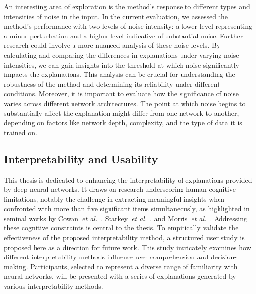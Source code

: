 An interesting area of exploration is the method's response to different types and intensities of noise in the input. In the current evaluation, we assessed the method's performance with two levels of noise intensity: a lower level representing a minor perturbation and a higher level indicative of substantial noise. Further research could involve a more nuanced analysis of these noise levels. By calculating and comparing the differences in explanations under varying noise intensities, we can gain insights into the threshold at which noise significantly impacts the explanations. This analysis can be crucial for understanding the robustness of the method and determining its reliability under different conditions. Moreover, it is important to evaluate how the significance of noise varies across different network architectures. The point at which noise begins to substantially affect the explanation might differ from one network to another, depending on factors like network depth, complexity, and the type of data it is trained on. 

\subsection{Interpretability and Usability}
\label{study}
This thesis is dedicated to enhancing the interpretability of explanations provided by deep neural networks. It draws on research underscoring human cognitive limitations, notably the challenge in extracting meaningful insights when confronted with more than five significant items simultaneously, as highlighted in seminal works by Cowan~\textit{et al.}~\cite{cowan2001magical}, Starkey~\textit{et al.}~\cite{starkey1995development}, and Morris~\textit{et al.}~\cite{morris2018human}. Addressing these cognitive constraints is central to the thesis. To empirically validate the effectiveness of the proposed interpretability method, a structured user study is proposed here as a direction for future work. This study intricately examines how different interpretability methods influence user comprehension and decision-making. Participants, selected to represent a diverse range of familiarity with neural networks, will be presented with a series of explanations generated by various interpretability methods.

